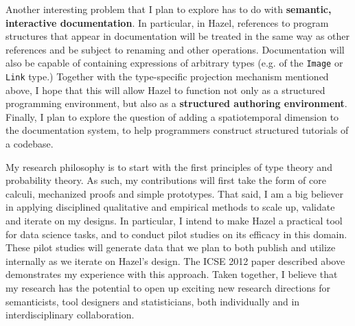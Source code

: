 \documentclass[9pt]{extarticle}
\let\li\lstinline
\begin{document}
Another interesting problem that I plan to explore has to do with \textbf{semantic, interactive documentation}. In particular, in Hazel, references to program structures that appear in documentation will be treated in the same way as other references and be subject to renaming and other operations. Documentation will also be capable of containing expressions of arbitrary types (e.g. of the \li{Image} or \li{Link} type.) Together with the type-specific projection mechanism mentioned above, I hope that this will allow Hazel to function not only as a structured programming environment, but also as a \textbf{structured authoring environment}. Finally, I plan to explore the question of adding a spatiotemporal dimension to the documentation system, to help programmers construct structured tutorials of a codebase.



My research philosophy is to start with the first principles of type theory and probability theory. As such, my contributions will first take the form of core calculi, mechanized proofs and simple prototypes. That said, I am a big believer in applying disciplined qualitative and empirical methods to scale up, validate and iterate on my designs. In particular, I intend to make Hazel a practical tool for data science tasks, and to conduct pilot studies on its efficacy in this domain. These pilot studies will generate data that we plan to both publish and utilize internally as we iterate on Hazel's design. The ICSE 2012 paper described above demonstrates my experience with this approach. Taken together, I believe that my research has the potential to open up exciting new research directions for semanticists, tool designers and statisticians, both individually and in interdisciplinary collaboration. 


 
\end{document}
